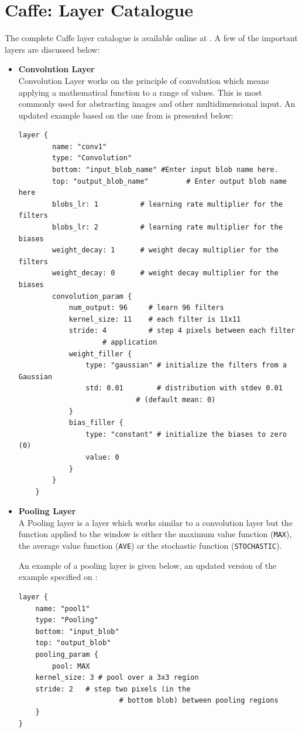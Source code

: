 \documentclass{article}
\begin{document}
\section{Caffe: Layer Catalogue}
The complete Caffe layer catalogue is available online at \cite{caffe:cl}. A few of the important layers are discussed below:
\begin{itemize}
	\item \textbf{Convolution Layer}\\
	Convolution Layer works on the principle of convolution which means applying a mathematical function to a range of values. This is most commonly used for abstracting images and other multidimensional input. An updated example based on the one from \cite{caffe:site} is presented below:
	\begin{lstlisting}[tabsize=2,breaklines=true]
	layer {
		name: "conv1"
		type: "Convolution"
		bottom: "input_blob_name" #Enter input blob name here.
		top: "output_blob_name"         # Enter output blob name here
		blobs_lr: 1          # learning rate multiplier for the filters
		blobs_lr: 2          # learning rate multiplier for the biases
		weight_decay: 1      # weight decay multiplier for the filters
		weight_decay: 0      # weight decay multiplier for the biases
		convolution_param {
			num_output: 96     # learn 96 filters
			kernel_size: 11    # each filter is 11x11
			stride: 4          # step 4 pixels between each filter
					# application
			weight_filler {
				type: "gaussian" # initialize the filters from a Gaussian
				std: 0.01        # distribution with stdev 0.01 
							# (default mean: 0)
			}
			bias_filler {
				type: "constant" # initialize the biases to zero (0)
				value: 0
			}
		}
	}
	\end{lstlisting}
	
	\item \textbf{Pooling Layer}\\
	A Pooling layer is a layer which works similar to a convolution layer but the function applied to the window is either the maximum value function (\verb|MAX|), the average value function (\verb|AVE|) or the stochastic function (\verb|STOCHASTIC|).
	\par	
	An example of a pooling layer is given below, an updated version of the example specified on \cite{caffe:site}:
	\begin{lstlisting}[tabsize=2,breaklines=true]
layer {
	name: "pool1"
	type: "Pooling"
	bottom: "input_blob"
	top: "output_blob"
	pooling_param {
		pool: MAX
	kernel_size: 3 # pool over a 3x3 region
	stride: 2   # step two pixels (in the 
						# bottom blob) between pooling regions
	}
}
	\end{lstlisting}
	

\end{itemize}
\end{document}
